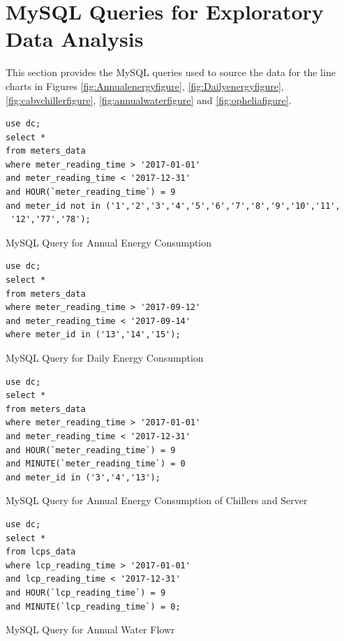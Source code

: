 \documentclass[12pt]{scrartcl}
\begin{document}
\section{MySQL Queries for Exploratory Data Analysis}
\label{sec:[MySQL Queries]}
This section provides the MySQL queries used to source the data for the line charts in Figures \ref{fig:Annualenergyfigure}, \ref{fig:Dailyenergyfigure}, \ref{fig:cabvchillerfigure}, \ref{fig:annualwaterfigure} and \ref{fig:opheliafigure}.


\begin{listing}[H]
\begin{verbatim}
use dc; 
select * 
from meters_data
where meter_reading_time > '2017-01-01'
and meter_reading_time < '2017-12-31'
and HOUR(`meter_reading_time`) = 9
and meter_id not in ('1','2','3','4','5','6','7','8','9','10','11',
 '12','77','78');
\end{verbatim}
\caption{MySQL Query for Annual Energy Consumption}
\label{list:[Annual Energy Consumption]}
\end{listing}

\begin{listing}[H]
\begin{verbatim}
use dc; 
select * 
from meters_data
where meter_reading_time > '2017-09-12'
and meter_reading_time < '2017-09-14'
where meter_id in ('13','14','15');
\end{verbatim}
\caption{MySQL Query for Daily Energy Consumption}
\label{list:[Annual Energy Consumption]}
\end{listing}

\begin{listing}[H]
\begin{verbatim}
use dc; 
select * 
from meters_data
where meter_reading_time > '2017-01-01'
and meter_reading_time < '2017-12-31'
and HOUR(`meter_reading_time`) = 9
and MINUTE(`meter_reading_time`) = 0
and meter_id in ('3','4','13');
\end{verbatim}
\caption{MySQL Query for Annual Energy Consumption of Chillers and Server}
\label{list:[MySQL Query for Annual Energy Consumption of Chillers and Server]}
\end{listing}

\begin{listing}[H]
\begin{verbatim}
use dc; 
select * 
from lcps_data
where lcp_reading_time > '2017-01-01'
and lcp_reading_time < '2017-12-31' 
and HOUR(`lcp_reading_time`) = 9
and MINUTE(`lcp_reading_time`) = 0;
\end{verbatim}
\caption{MySQL Query for Annual Water Flowr}
\label{list:[MySQL Query for Annual Water Flow]}
\end{listing}
\end{document}
